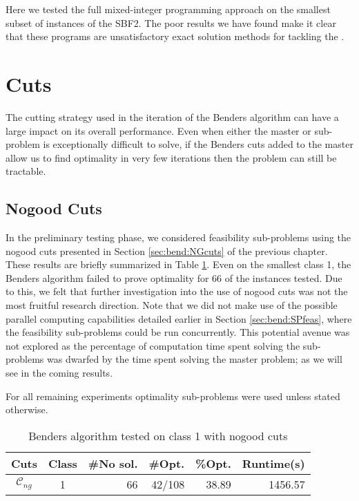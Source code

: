 Here we tested the full mixed-integer programming approach
on the smallest subset of instances of the SBF2.
The poor results we have found make it clear that these programs
are unsatisfactory exact solution methods for tackling
the .

\section{Cuts}
\label{sec:exp:cuts}
The cutting strategy used in the iteration of the Benders
algorithm can have a large impact on its overall performance.
Even when either the master or sub-problem is exceptionally
difficult to solve, if the Benders cuts added to the master
allow us to find optimality in very few iterations then the problem
can still be tractable.

\subsection{Nogood Cuts}
\label{sec:exp:NGcuts}
In the preliminary testing phase, we considered feasibility sub-problems
using the nogood cuts presented in Section \ref{sec:bend:NGcuts} of the 
previous chapter.
These results are briefly summarized in Table \ref{tab:exp:resultsNGcut}.
Even on the smallest class 1, the Benders
algorithm failed to prove optimality for 66 of the instances tested.
Due to this, we felt that further investigation into the use
of nogood cuts was not the most fruitful research direction. 
Note that we did not make use of the possible parallel computing capabilities
detailed earlier in Section \ref{sec:bend:SPfeas},
where the feasibility sub-problems could be run concurrently.
This potential avenue was not explored as the percentage of computation
time spent solving the sub-problems was dwarfed by the time spent solving
the master problem; as we will see in the coming results.

For all remaining experiments optimality sub-problems were used
unless stated otherwise.

\begin{table}[tpb]
	\caption{Benders algorithm tested on class 1 with nogood cuts}
	\centering
	\vspace{2mm}
	\begin{tabular}{ccrrrr}
		\toprule
		Cuts & Class & \#No sol. & \#Opt. & \%Opt. & Runtime(s) \\\midrule\midrule
		$\mathcal{C}_{ng}$ & 1 & 66 & 42/108 & 38.89 & 1456.57 \\
		\bottomrule
	\end{tabular}
	\label{tab:exp:resultsNGcut}
\end{table}

